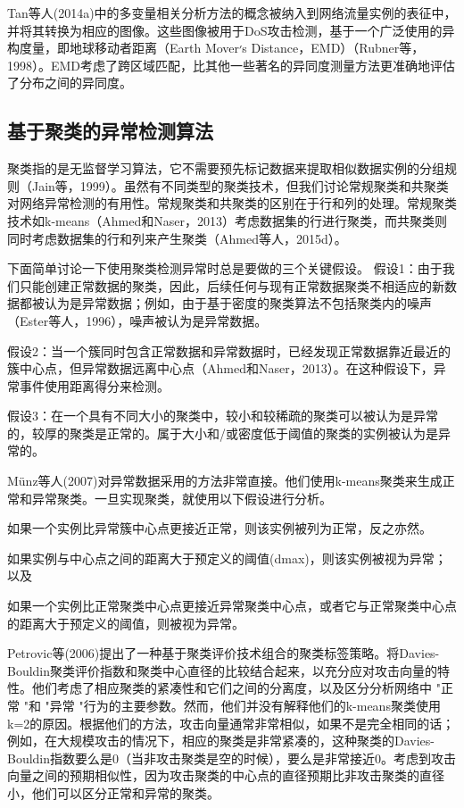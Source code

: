 Tan等人(2014a)中的多变量相关分析方法的概念被纳入到网络流量实例的表征中，并将其转换为相应的图像。这些图像被用于DoS攻击检测，基于一个广泛使用的异构度量，即地球移动者距离（Earth Mover׳s Distance，EMD）（Rubner等，1998）。EMD考虑了跨区域匹配，比其他一些著名的异同度测量方法更准确地评估了分布之间的异同度。

\subsection{基于聚类的异常检测算法}

聚类指的是无监督学习算法，它不需要预先标记数据来提取相似数据实例的分组规则（Jain等，1999）。虽然有不同类型的聚类技术，但我们讨论常规聚类和共聚类对网络异常检测的有用性。常规聚类和共聚类的区别在于行和列的处理。常规聚类技术如k-means（Ahmed和Naser，2013）考虑数据集的行进行聚类，而共聚类则同时考虑数据集的行和列来产生聚类（Ahmed等人，2015d）。

下面简单讨论一下使用聚类检测异常时总是要做的三个关键假设。
假设1：由于我们只能创建正常数据的聚类，因此，后续任何与现有正常数据聚类不相适应的新数据都被认为是异常数据；例如，由于基于密度的聚类算法不包括聚类内的噪声（Ester等人，1996），噪声被认为是异常数据。

假设2：当一个簇同时包含正常数据和异常数据时，已经发现正常数据靠近最近的簇中心点，但异常数据远离中心点（Ahmed和Naser，2013）。在这种假设下，异常事件使用距离得分来检测。

假设3：在一个具有不同大小的聚类中，较小和较稀疏的聚类可以被认为是异常的，较厚的聚类是正常的。属于大小和/或密度低于阈值的聚类的实例被认为是异常的。


Münz等人(2007)对异常数据采用的方法非常直接。他们使用k-means聚类来生成正常和异常聚类。一旦实现聚类，就使用以下假设进行分析。

如果一个实例比异常簇中心点更接近正常，则该实例被列为正常，反之亦然。


如果实例与中心点之间的距离大于预定义的阈值(dmax)，则该实例被视为异常；以及


如果一个实例比正常聚类中心点更接近异常聚类中心点，或者它与正常聚类中心点的距离大于预定义的阈值，则被视为异常。


Petrovic等(2006)提出了一种基于聚类评价技术组合的聚类标签策略。将Davies-Bouldin聚类评价指数和聚类中心直径的比较结合起来，以充分应对攻击向量的特性。他们考虑了相应聚类的紧凑性和它们之间的分离度，以及区分分析网络中 "正常 "和 "异常 "行为的主要参数。然而，他们并没有解释他们的k-means聚类使用k=2的原因。根据他们的方法，攻击向量通常非常相似，如果不是完全相同的话；例如，在大规模攻击的情况下，相应的聚类是非常紧凑的，这种聚类的Davies-Bouldin指数要么是0（当非攻击聚类是空的时候），要么是非常接近0。考虑到攻击向量之间的预期相似性，因为攻击聚类的中心点的直径预期比非攻击聚类的直径小，他们可以区分正常和异常的聚类。

